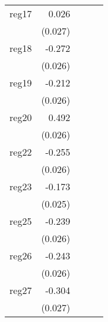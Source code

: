 {\begin{longtable}{l*{4}{D{.}{.}{-1}}}
\addlinespace
reg17       &       0.026         &                     &                     &                     \\
            &     (0.027)         &                     &                     &                     \\
\addlinespace
reg18       &      -0.272\sym{***}&                     &                     &                     \\
            &     (0.026)         &                     &                     &                     \\
\addlinespace
reg19       &      -0.212\sym{***}&                     &                     &                     \\
            &     (0.026)         &                     &                     &                     \\
\addlinespace
reg20       &       0.492\sym{***}&                     &                     &                     \\
            &     (0.026)         &                     &                     &                     \\
\addlinespace
reg22       &      -0.255\sym{***}&                     &                     &                     \\
            &     (0.026)         &                     &                     &                     \\
\addlinespace
reg23       &      -0.173\sym{***}&                     &                     &                     \\
            &     (0.025)         &                     &                     &                     \\
\addlinespace
reg25       &      -0.239\sym{***}&                     &                     &                     \\
            &     (0.026)         &                     &                     &                     \\
\addlinespace
reg26       &      -0.243\sym{***}&                     &                     &                     \\
            &     (0.026)         &                     &                     &                     \\
\addlinespace
reg27       &      -0.304\sym{***}&                     &                     &                     \\
            &     (0.027)         &                     &                     &                     \\

\end{longtable}}
